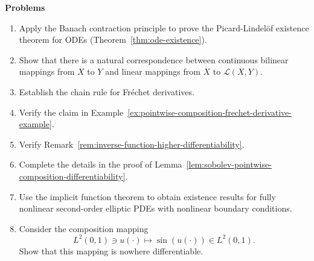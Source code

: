 \textbf{Problems}

\begin{enumerate}[label=\thesection.\arabic*.,ref=\thesection.\arabic*,start=1,series=book-problems]

\item\label{ex:banach-contraction-picard-lindelof-existence} Apply the Banach contraction principle to prove the Picard-Lindelöf existence theorem for ODEs (Theorem~\ref{thm:ode-existence}).

\item\label{ex:continuous-bilinear-linear-operator-correspondence} Show that there is a natural correspondence between continuous bilinear mappings from $X$ to $Y$ and linear mappings from $X$ to $\mathcal{L}(X,Y)$.

\item\label{ex:frechet-derivative-chain-rule} Establish the chain rule for Fréchet derivatives.

\item\label{ex:pointwise-composition-frechet-derivative} Verify the claim in Example~\ref{ex:pointwise-composition-frechet-derivative-example}.

\item\label{ex:inverse-function-higher-differentiability} Verify Remark~\ref{rem:inverse-function-higher-differentiability}.

\item\label{ex:sobolev-composition-lemma-details} Complete the details in the proof of Lemma~\ref{lem:sobolev-pointwise-composition-differentiability}.

\item\label{ex:implicit-function-fully-nonlinear-elliptic-boundary-problems} Use the implicit function theorem to obtain existence results for fully nonlinear second-order elliptic PDEs with nonlinear boundary conditions.

\item\label{ex:sine-composition-ltwo-nowhere-differentiability} Consider the composition mapping\[L^2(0,1)\ni u(\cdot)\mapsto\sin(u(\cdot))\in L^2(0,1).\]Show that this mapping is nowhere differentiable.

\end{enumerate}
